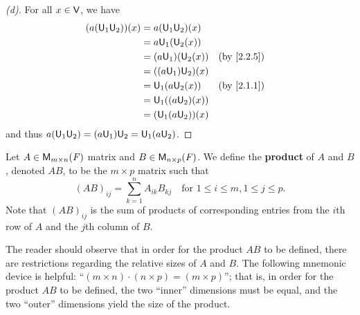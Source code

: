 \begin{proof}[(d)]
  For all \(x \in \mathsf{V}\), we have
  \begin{align*}
    (a (\U_1 \U_2))(x) & = a (\U_1 \U_2)(x)                                 \\
                       & = a \U_1(\U_2(x))                                  \\
                       & = (a \U_1)(\U_2(x))  &  & \text{(by \cref{2.2.5})} \\
                       & = ((a \U_1) \U_2)(x)                               \\
                       & = \U_1(a \U_2(x))    &  & \text{(by \cref{2.1.1})} \\
                       & = \U_1((a \U_2)(x))                                \\
                       & = (\U_1 (a \U_2))(x)
  \end{align*}
  and thus \(a (\mathsf{U}_1 \mathsf{U}_2) = (a \mathsf{U}_1) \mathsf{U}_2 = \mathsf{U}_1 (a \mathsf{U}_2)\).
\end{proof}

\begin{defn}\label{2.3.1}
  Let \(A \in \mathsf{M}_{{m} \times n}({\mathit{F}})\) matrix and \(B \in \mathsf{M}_{{n} \times p}({\mathit{F}})\).
  We define the \textbf{product} of \(A\) and \(B\), denoted \(AB\), to be the \(m \times p\) matrix such that
  \[
    (AB)_{i j} = \sum_{k = 1}^n A_{i k} B_{k j} \quad \text{for } 1 \leq i \leq m, 1 \leq j \leq p.
  \]
  Note that \((AB)_{i j}\) is the sum of products of corresponding entries from the \(i\)th row of \(A\) and the \(j\)th column of \(B\).
\end{defn}

\begin{note}
  The reader should observe that in order for the product \(AB\) to be defined, there are restrictions regarding the relative sizes of \(A\) and \(B\).
  The following mnemonic device is helpful:
  ``\((m \times n) \cdot (n \times p) = (m \times p)\)'';
  that is, in order for the product \(AB\) to be defined, the two ``inner'' dimensions must be equal, and the two ``outer'' dimensions yield the size of the product.
\end{note}

